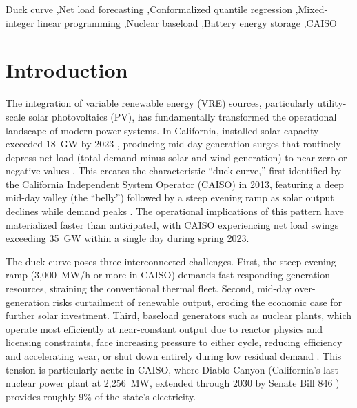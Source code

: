 \documentclass[preprint,12pt,authoryear]{elsarticle}
\begin{document}
\begin{frontmatter}
\begin{keyword}
Duck curve \sep Net load forecasting \sep Conformalized quantile regression \sep Mixed-integer linear programming \sep Nuclear baseload \sep Battery energy storage \sep CAISO
\end{keyword}

\end{frontmatter}

\section{Introduction}
\label{sec:intro}

The integration of variable renewable energy (VRE) sources, particularly utility-scale solar photovoltaics (PV), has fundamentally transformed the operational landscape of modern power systems. In California, installed solar capacity exceeded 18~GW by 2023 \citep{caiso2023}, producing mid-day generation surges that routinely depress net load (total demand minus solar and wind generation) to near-zero or negative values \citep{denholm2015}. This creates the characteristic ``duck curve,'' first identified by the California Independent System Operator (CAISO) in 2013, featuring a deep mid-day valley (the ``belly'') followed by a steep evening ramp as solar output declines while demand peaks \citep{caiso2016}. The operational implications of this pattern have materialized faster than anticipated, with CAISO experiencing net load swings exceeding 35~GW within a single day during spring 2023.

The duck curve poses three interconnected challenges. First, the steep evening ramp (3{,}000~MW/h or more in CAISO) demands fast-responding generation resources, straining the conventional thermal fleet. Second, mid-day over-generation risks curtailment of renewable output, eroding the economic case for further solar investment. Third, baseload generators such as nuclear plants, which operate most efficiently at near-constant output due to reactor physics and licensing constraints, face increasing pressure to either cycle, reducing efficiency and accelerating wear, or shut down entirely during low residual demand \citep{jenkins2018}. This tension is particularly acute in CAISO, where Diablo Canyon (California's last nuclear power plant at 2{,}256~MW, extended through 2030 by Senate Bill 846 \citep{sb846}) provides roughly 9\% of the state's electricity.
\end{document}
